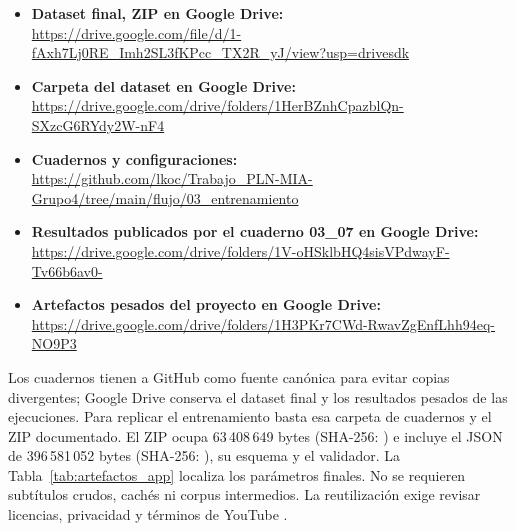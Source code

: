 \begin{itemize}
  \setlength{\itemsep}{3pt}
  \setlength{\parsep}{0pt}
  \setlength{\parskip}{0pt}
  \item \textbf{Dataset final, ZIP en Google Drive:}\\
  \url{https://drive.google.com/file/d/1-fAxh7Lj0RE_Imh2SL3fKPcc_TX2R_yJ/view?usp=drivesdk}
  \item \textbf{Carpeta del dataset en Google Drive:}\\
  \url{https://drive.google.com/drive/folders/1HerBZnhCpazblQn-SXzcG6RYdy2W-nF4}
  \item \textbf{Cuadernos y configuraciones:}\\
  \url{https://github.com/lkoc/Trabajo_PLN-MIA-Grupo4/tree/main/flujo/03_entrenamiento}
  \item \textbf{Resultados publicados por el cuaderno 03\_07 en Google Drive:}\\
  \url{https://drive.google.com/drive/folders/1V-oHSklbHQ4sisVPdwayF-Tv66b6av0-}
  \item \textbf{Artefactos pesados del proyecto en Google Drive:}\\
  \url{https://drive.google.com/drive/folders/1H3PKr7CWd-RwavZgEnfLhh94eq-NO9P3}
\end{itemize}

Los cuadernos tienen a GitHub como fuente canónica para evitar copias divergentes; Google Drive conserva el dataset final y los resultados pesados de las ejecuciones. Para replicar el entrenamiento basta esa carpeta de cuadernos y el ZIP documentado. El ZIP ocupa 63\,408\,649 bytes (SHA-256: ) e incluye el JSON de 396\,581\,052 bytes (SHA-256: ), su esquema y el validador. La Tabla~\ref{tab:artefactos_app} localiza los parámetros finales. No se requieren subtítulos crudos, cachés ni corpus intermedios. La reutilización exige revisar licencias, privacidad y términos de YouTube \cite{youtube2023terms,aoir2020ethics}.

\clearpage
\twocolumn
